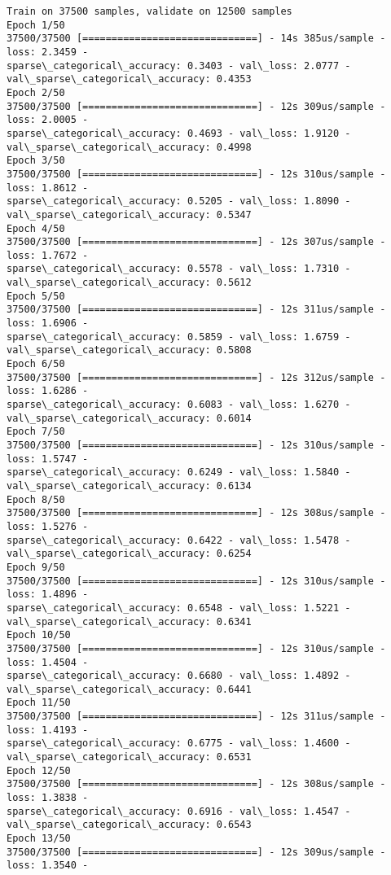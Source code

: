 \documentclass[11pt]{article}
\begin{document}
    \begin{Verbatim}[commandchars=\\\{\}]
Train on 37500 samples, validate on 12500 samples
Epoch 1/50
37500/37500 [==============================] - 14s 385us/sample - loss: 2.3459 -
sparse\_categorical\_accuracy: 0.3403 - val\_loss: 2.0777 -
val\_sparse\_categorical\_accuracy: 0.4353
Epoch 2/50
37500/37500 [==============================] - 12s 309us/sample - loss: 2.0005 -
sparse\_categorical\_accuracy: 0.4693 - val\_loss: 1.9120 -
val\_sparse\_categorical\_accuracy: 0.4998
Epoch 3/50
37500/37500 [==============================] - 12s 310us/sample - loss: 1.8612 -
sparse\_categorical\_accuracy: 0.5205 - val\_loss: 1.8090 -
val\_sparse\_categorical\_accuracy: 0.5347
Epoch 4/50
37500/37500 [==============================] - 12s 307us/sample - loss: 1.7672 -
sparse\_categorical\_accuracy: 0.5578 - val\_loss: 1.7310 -
val\_sparse\_categorical\_accuracy: 0.5612
Epoch 5/50
37500/37500 [==============================] - 12s 311us/sample - loss: 1.6906 -
sparse\_categorical\_accuracy: 0.5859 - val\_loss: 1.6759 -
val\_sparse\_categorical\_accuracy: 0.5808
Epoch 6/50
37500/37500 [==============================] - 12s 312us/sample - loss: 1.6286 -
sparse\_categorical\_accuracy: 0.6083 - val\_loss: 1.6270 -
val\_sparse\_categorical\_accuracy: 0.6014
Epoch 7/50
37500/37500 [==============================] - 12s 310us/sample - loss: 1.5747 -
sparse\_categorical\_accuracy: 0.6249 - val\_loss: 1.5840 -
val\_sparse\_categorical\_accuracy: 0.6134
Epoch 8/50
37500/37500 [==============================] - 12s 308us/sample - loss: 1.5276 -
sparse\_categorical\_accuracy: 0.6422 - val\_loss: 1.5478 -
val\_sparse\_categorical\_accuracy: 0.6254
Epoch 9/50
37500/37500 [==============================] - 12s 310us/sample - loss: 1.4896 -
sparse\_categorical\_accuracy: 0.6548 - val\_loss: 1.5221 -
val\_sparse\_categorical\_accuracy: 0.6341
Epoch 10/50
37500/37500 [==============================] - 12s 310us/sample - loss: 1.4504 -
sparse\_categorical\_accuracy: 0.6680 - val\_loss: 1.4892 -
val\_sparse\_categorical\_accuracy: 0.6441
Epoch 11/50
37500/37500 [==============================] - 12s 311us/sample - loss: 1.4193 -
sparse\_categorical\_accuracy: 0.6775 - val\_loss: 1.4600 -
val\_sparse\_categorical\_accuracy: 0.6531
Epoch 12/50
37500/37500 [==============================] - 12s 308us/sample - loss: 1.3838 -
sparse\_categorical\_accuracy: 0.6916 - val\_loss: 1.4547 -
val\_sparse\_categorical\_accuracy: 0.6543
Epoch 13/50
37500/37500 [==============================] - 12s 309us/sample - loss: 1.3540 -

\end{Verbatim}
\end{document}
